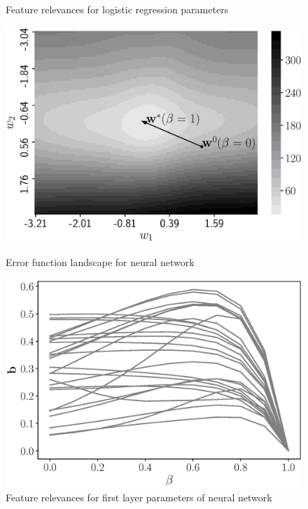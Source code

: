 \documentclass[
11pt,%
tightenlines,%
twoside,%
onecolumn,%
nofloats,%
nobibnotes,%
nofootinbib,%
superscriptaddress,%
noshowpacs,%
centertags]%
{revtex4}
\begin{document}
\begin{figure}
\begin{minipage}{.5\textwidth}
		\caption{Feature relevances for logistic regression parameters}
		\label{fig:log_reg_b_wrt_beta}
	\end{minipage}
\end{figure}
\begin{figure}
	\centering
	\begin{minipage}{.5\textwidth}
		\setcaptionmargin{5mm}
		\onelinecaptionsfalse %
		\centering
		\includegraphics[width=\linewidth]{figs/gray_neural_error.eps}
		\caption{Error function landscape for neural network}
		\label{fig:neural_error}
	\end{minipage}%
	\begin{minipage}{.5\textwidth}
		\setcaptionmargin{5mm}
		\onelinecaptionsfalse %
		\centering
		\includegraphics[width=\linewidth]{figs/gray_neural_b_wrt_beta.eps}
		\caption{Feature relevances for first layer parameters of neural network}
		\label{fig:neural_b_wrt_beta}
	\end{minipage}
\end{figure}
\end{document}
